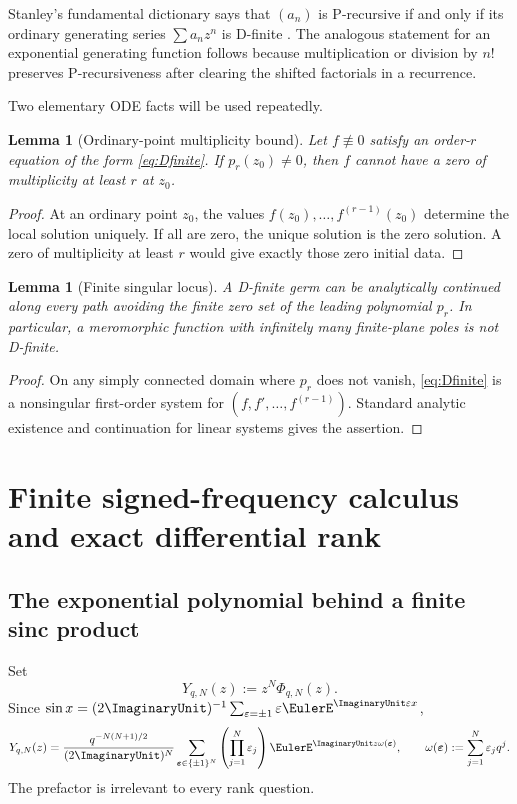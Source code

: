 \documentclass[11pt]{article}
\numberwithin{equation}{section}
\newtheorem{lemma}[theorem]{Lemma}
\theoremstyle{definition}
\theoremstyle{remark}
\newcommand{\eps}{\varepsilon}
\begin{document}
Stanley's fundamental dictionary says that $(a_n)$ is P-recursive if and only
if its ordinary generating series $\sum a_nz^n$ is D-finite
\cite{StanleyDfinite}.  The analogous statement for an exponential generating
function follows because multiplication or division by $n!$ preserves
P-recursiveness after clearing the shifted factorials in a recurrence.

Two elementary ODE facts will be used repeatedly.
\begin{lemma}[Ordinary-point multiplicity bound]
\label{lem:zero-multiplicity}
Let $f\not\equiv0$ satisfy an order-$r$ equation of the form
\eqref{eq:Dfinite}.  If $p_r(z_0)\ne0$, then $f$ cannot have a zero of
multiplicity at least $r$ at $z_0$.
\end{lemma}
\begin{proof}
At an ordinary point $z_0$, the values
$f(z_0),\ldots,f^{(r-1)}(z_0)$ determine the local solution uniquely.  If all
are zero, the unique solution is the zero solution.  A zero of multiplicity at
least $r$ would give exactly those zero initial data.
\end{proof}

\begin{lemma}[Finite singular locus]
\label{lem:finite-singular-locus}
A D-finite germ can be analytically continued along every path avoiding the
finite zero set of the leading polynomial $p_r$.  In particular, a meromorphic
function with infinitely many finite-plane poles is not D-finite.
\end{lemma}
\begin{proof}
On any simply connected domain where $p_r$ does not vanish,
\eqref{eq:Dfinite} is a nonsingular first-order system for
$(f,f',\ldots,f^{(r-1)})$.  Standard analytic existence and continuation for
linear systems gives the assertion.
\end{proof}

\section{Finite signed-frequency calculus and exact differential rank}
\label{sec:finite-rank}

\subsection{The exponential polynomial behind a finite sinc product}

Set
\begin{equation}
 Y_{q,N}(z):=z^N\Phi_{q,N}(z).
 \label{eq:gauged-product}
\end{equation}
Since
$\sin x=(2\ImaginaryUnit)^{-1}\sum_{\eps=\pm1}\eps\EulerE^{\ImaginaryUnit\eps x}$,
\begin{equation}
 Y_{q,N}(z)=\frac{q^{-N(N+1)/2}}{(2\ImaginaryUnit)^N}
 \sum_{\bm\eps\in\{\pm1\}^N}
 \left(\prod_{j=1}^{N}\eps_j\right)
 \EulerE^{\ImaginaryUnit z\omega(\bm\eps)},
 \qquad
 \omega(\bm\eps):=\sum_{j=1}^{N}\eps_jq^j.
 \label{eq:frequency-expansion}
\end{equation}
The prefactor is irrelevant to every rank question.
\end{document}

